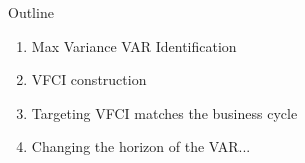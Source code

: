 \begin{frame}{Outline}

  \begin{enumerate}
    \item Max Variance VAR Identification
    \item VFCI construction
    \item Targeting VFCI matches the business cycle
    \item Changing the horizon of the VAR...
  \end{enumerate}

\end{frame}